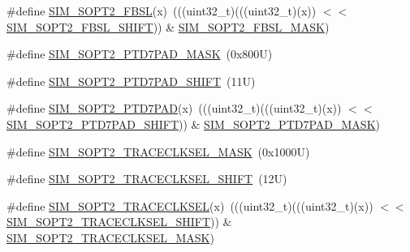 \begin{DoxyCompactItemize}
\item 
\#define \mbox{\hyperlink{group___s_i_m___register___masks_ga0ac5747a6f12a63218b75398d10d4af1}{S\+I\+M\+\_\+\+S\+O\+P\+T2\+\_\+\+F\+B\+SL}}(x)~(((uint32\+\_\+t)(((uint32\+\_\+t)(x)) $<$$<$ \mbox{\hyperlink{group___s_i_m___register___masks_ga7077057e2a7f0841d8151d2703d85f16}{S\+I\+M\+\_\+\+S\+O\+P\+T2\+\_\+\+F\+B\+S\+L\+\_\+\+S\+H\+I\+FT}})) \& \mbox{\hyperlink{group___s_i_m___register___masks_ga27b0cb220aaf94e8d04795bd682ebd78}{S\+I\+M\+\_\+\+S\+O\+P\+T2\+\_\+\+F\+B\+S\+L\+\_\+\+M\+A\+SK}})
\item 
\#define \mbox{\hyperlink{group___s_i_m___register___masks_gaf295c85205620f0ece4cf7a888fc298f}{S\+I\+M\+\_\+\+S\+O\+P\+T2\+\_\+\+P\+T\+D7\+P\+A\+D\+\_\+\+M\+A\+SK}}~(0x800\+U)
\item 
\#define \mbox{\hyperlink{group___s_i_m___register___masks_ga82543a91a19387f58f922371b4b5cc95}{S\+I\+M\+\_\+\+S\+O\+P\+T2\+\_\+\+P\+T\+D7\+P\+A\+D\+\_\+\+S\+H\+I\+FT}}~(11\+U)
\item 
\#define \mbox{\hyperlink{group___s_i_m___register___masks_ga9485b2c9de24268ebd1ae620622fcefa}{S\+I\+M\+\_\+\+S\+O\+P\+T2\+\_\+\+P\+T\+D7\+P\+AD}}(x)~(((uint32\+\_\+t)(((uint32\+\_\+t)(x)) $<$$<$ \mbox{\hyperlink{group___s_i_m___register___masks_ga82543a91a19387f58f922371b4b5cc95}{S\+I\+M\+\_\+\+S\+O\+P\+T2\+\_\+\+P\+T\+D7\+P\+A\+D\+\_\+\+S\+H\+I\+FT}})) \& \mbox{\hyperlink{group___s_i_m___register___masks_gaf295c85205620f0ece4cf7a888fc298f}{S\+I\+M\+\_\+\+S\+O\+P\+T2\+\_\+\+P\+T\+D7\+P\+A\+D\+\_\+\+M\+A\+SK}})
\item 
\#define \mbox{\hyperlink{group___s_i_m___register___masks_ga332894211abcda547cbf5d5093bd3f72}{S\+I\+M\+\_\+\+S\+O\+P\+T2\+\_\+\+T\+R\+A\+C\+E\+C\+L\+K\+S\+E\+L\+\_\+\+M\+A\+SK}}~(0x1000\+U)
\item 
\#define \mbox{\hyperlink{group___s_i_m___register___masks_ga6ce7d361b38ac28e6976c71569fe672b}{S\+I\+M\+\_\+\+S\+O\+P\+T2\+\_\+\+T\+R\+A\+C\+E\+C\+L\+K\+S\+E\+L\+\_\+\+S\+H\+I\+FT}}~(12\+U)
\item 
\#define \mbox{\hyperlink{group___s_i_m___register___masks_gab41ae06e22c877ac157ce08f0afdf981}{S\+I\+M\+\_\+\+S\+O\+P\+T2\+\_\+\+T\+R\+A\+C\+E\+C\+L\+K\+S\+EL}}(x)~(((uint32\+\_\+t)(((uint32\+\_\+t)(x)) $<$$<$ \mbox{\hyperlink{group___s_i_m___register___masks_ga6ce7d361b38ac28e6976c71569fe672b}{S\+I\+M\+\_\+\+S\+O\+P\+T2\+\_\+\+T\+R\+A\+C\+E\+C\+L\+K\+S\+E\+L\+\_\+\+S\+H\+I\+FT}})) \& \mbox{\hyperlink{group___s_i_m___register___masks_ga332894211abcda547cbf5d5093bd3f72}{S\+I\+M\+\_\+\+S\+O\+P\+T2\+\_\+\+T\+R\+A\+C\+E\+C\+L\+K\+S\+E\+L\+\_\+\+M\+A\+SK}})
$$
\end{DoxyCompactItemize}
